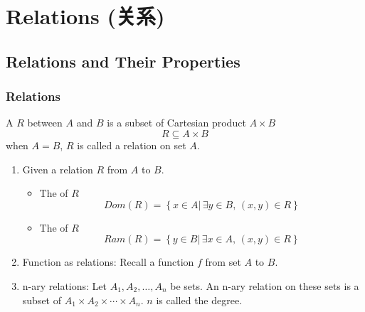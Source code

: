\section[Relations]{Relations (关系)}

\subsection{Relations and Their Properties}

\subsubsection{Relations}
\begin{definition}
    A  $R$ between $A$ and $B$ is a subset of Cartesian product $A\times B$
    \[ R\subseteq A\times B \]
    when $A=B$, $R$ is called a relation on set $A$. 
\end{definition}

\begin{enumerate}
    \item Given a relation $R$ from $A$ to $B$. 
    \begin{itemize}
        \item The  of $R$
        \[ Dom(R)=\left\{ x\in A |\, \exists y \in B, \, (x,y) \in R  \right\} \]
        \item The  of $R$
        \[ Ram(R)=\left\{ y\in B | \,\exists x\in A ,\, (x,y)\in R \right\} \]
    \end{itemize}
    \item Function as relations: Recall a function $f$ from set $A$ to $B$. 
    \item n-ary relations: Let $A_1,A_2,\dots,A_n$ be sets. An n-ary relation on these sets is a subset of $A_1\times A_2\times \cdots\times A_n$. $n$  is called the degree. 
\end{enumerate}

